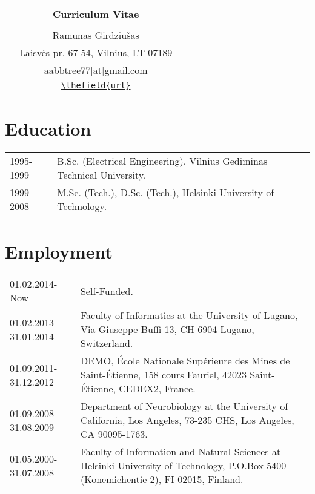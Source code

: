\documentclass[a4paper,11pt]{article}
\DeclareRobustCommand{\murl}[1]{%
  \href{#1}{%
    \begingroup
      \IfSubStr{#1}{https://}{%
        \StrBehind{#1}{https://}[\ShortUrl]%
      }{%
        \IfSubStr{#1}{http://}{%
          \StrBehind{#1}{http://}[\ShortUrl]%
        }{%
          \edef\ShortUrl{#1}%
        }%
      }%
      \nolinkurl{\ShortUrl}%
    \endgroup
  }%
}
\edef\ShortUrl{\thefield{url}}%
\begin{document}
\begin{center}
\begin{tabular}{ccc}
&\Large \textbf{Curriculum Vitae}&\\
\\
& \textlithuanian{Ramūnas Girdziušas} &\\  
& \textlithuanian{Laisvės} pr. 67-54, Vilnius, LT-07189 &\\
& aabbtree77[at]gmail.com &\\
& \murl{https://aabbtree77.github.io/}
\end{tabular}
\end{center}
%
\section{Education}
%
\begin{tabularx}{\textwidth}{@{}p{3cm}X@{}}
1995-1999  & B.Sc. (Electrical Engineering), Vilnius Gediminas Technical University.\\
1999-2008  &  M.Sc. (Tech.), D.Sc. (Tech.), Helsinki University of Technology.\\
\end{tabularx}
%
\section{Employment}
%
\begin{tabularx}{\textwidth}{@{}p{3cm}X@{}}
01.02.2014-Now & Self-Funded. \\

01.02.2013-31.01.2014 &
Faculty of Informatics at the University of Lugano, Via Giuseppe Buffi 13, CH-6904 Lugano, Switzerland. \\

01.09.2011-31.12.2012 &
DEMO, École Nationale Supérieure des Mines de Saint-Étienne, 158 cours Fauriel, 42023 Saint-Étienne, CEDEX2, France. \\

01.09.2008-31.08.2009 &
Department of Neurobiology at the University of California, Los Angeles, 73-235 CHS, Los Angeles, CA 90095-1763. \\

01.05.2000-31.07.2008 &
Faculty of Information and Natural Sciences at Helsinki University of Technology, P.O.Box 5400 (Konemiehentie 2), FI-02015, Finland. \\
\end{tabularx}
\end{document}
